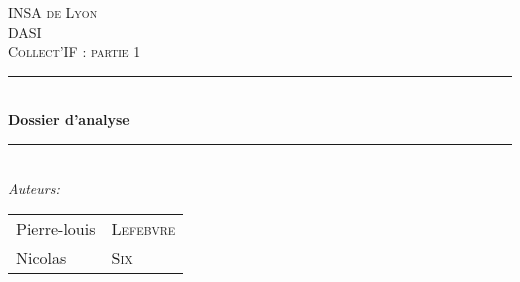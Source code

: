 \newcommand{\HRule}{\rule{\linewidth}{0.5mm}} %

  \center %
   

  \textsc{\LARGE INSA de Lyon}\\[1.5cm] %
  \textsc{\Large DASI}\\[0.5cm] %
  \textsc{\large Collect'IF : partie 1}\\[0.5cm] %


  \HRule \\[0.4cm]
  { \huge \bfseries Dossier d'analyse}\\[0.1cm] %
  \HRule \\[1.5cm]
   

  \Large \emph{Auteurs:}\\[1cm]
  \begin{table}[h]
    \begin{center}
      \begin{tabularx}{10cm}{R L}
         Pierre-louis & \textsc{Lefebvre} \\
         Nicolas & \textsc{Six} \\[5cm]
      \end{tabularx}
    \end{center}
  \end{table}
  

